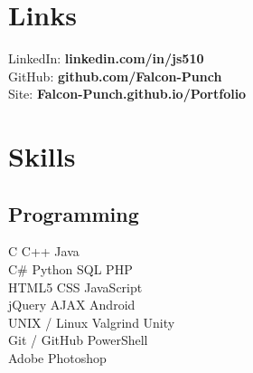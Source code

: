 \documentclass[letterpaper]{deedy-resume} %
\newcommand{\CS}{C\#}
\begin{document}
\begin{minipage}[t]{0.33\textwidth}
\sectionspace %




\section{Links} 

LinkedIn: {\bf linkedin.com/in/js510}\\
GitHub: {\bf github.com/Falcon-Punch}\\
Site: {\bf Falcon-Punch.github.io/Portfolio}

\sectionspace %


\section{Skills}

\subsection{Programming}
\vspace{1.5mm}
C \textbullet{} C++ \textbullet{} Java \\
\vspace{1.5mm}
\CS{} \textbullet{} Python \textbullet{} SQL \textbullet{} PHP \\
HTML5 \textbullet{} CSS \textbullet{} JavaScript \\
\vspace{1.5mm}
jQuery \textbullet{} AJAX \textbullet{} Android\\
UNIX / Linux \textbullet{} Valgrind \textbullet{} Unity\\
Git / GitHub \textbullet{} PowerShell \\
Adobe Photoshop

\sectionspace %




\end{minipage}
\end{document}
